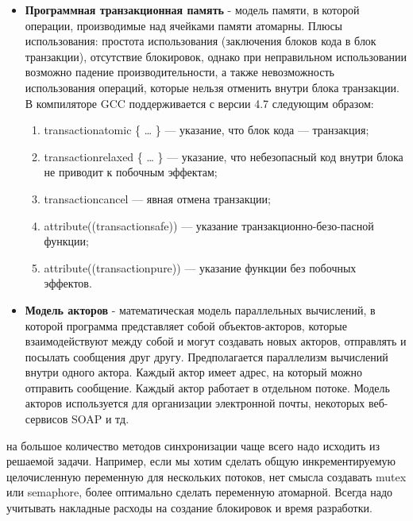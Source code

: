 {		\begin{itemize}
			\item\textbf{Программная транзакционная память} - модель памяти, в которой операции, производимые над ячейками памяти атомарны. Плюсы использования: простота использования (заключения блоков кода в блок транзакции), отсутствие блокировок, однако при неправильном использовании возможно падение производительности, а также невозможность использования операций, которые нельзя отменить внутри блока транзакции. В компиляторе GCC поддерживается с версии 4.7 следующим образом: 
				\begin{enumerate}
					\item\textunderscore \textunderscore transaction\textunderscore atomic \{ … \} — указание, что блок кода — транзакция;
					\item\textunderscore \textunderscore transaction\textunderscore relaxed \{ … \} — указание, что небезопасный код внутри блока не приводит к побочным эффектам;
					\item\textunderscore \textunderscore transaction\textunderscore cancel — явная отмена транзакции;
					\item attribute((transaction\textunderscore safe)) — указание транзакционно-безо-пасной функции;
					\item attribute((transaction\textunderscore pure)) — указание функции без побочных эффектов.
				\end{enumerate}
			\item\textbf{Модель акторов} - математическая модель параллельных вычислений, в которой программа представляет собой объектов-акторов, которые взаимодействуют между собой и могут создавать новых акторов, отправлять и посылать сообщения друг другу. Предполагается параллелизм вычислений внутри одного актора. Каждый актор имеет адрес, на который можно отправить сообщение. Каждый актор работает в отдельном потоке. Модель акторов используется для организации электронной почты, некоторых веб-сервисов SOAP и тд.
		\end{itemize}
	 на большое количество методов синхронизации чаще всего надо исходить из решаемой задачи. Например, если мы хотим сделать общую инкрементируемую целочисленную переменную для нескольких потоков, нет смысла создавать mutex или semaphore, более оптимально сделать переменную атомарной. Всегда надо учитывать накладные расходы на создание блокировок и время разработки.
}